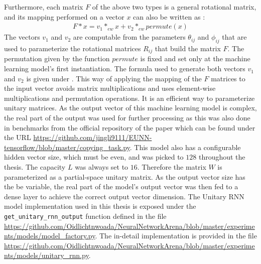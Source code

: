 \documentclass[draft,final]{vutinfth} %
\begin{document}
Furthermore, each matrix $F$ of the above two types is a general rotational matrix, and its mapping performed on a vector $x$ can also be written as \cite[p. 4]{EfficientUnitaryRNNs}:
\begin{align}
F*x = v_1 *_{ew} x + v_2 *_{ew} permute(x)
\end{align}
The vectors $v_1$ and $v_2$ are computable from the parameters $\theta_{ij}$ and $\phi_{ij}$ that are used to parameterize the rotational matrices $R_{ij}$ that build the matrix $F$.
The permutation given by the function $permute$ is fixed and set only at the machine learning model's first instantiation.
The formula used to generate both vectors $v_1$ and $v_2$ is given under \cite[p. 4]{EfficientUnitaryRNNs}.
This way of applying the mapping of the $F$ matrices to the input vector avoids matrix multiplications and uses element-wise multiplications and permutation operations. It is an efficient way to parameterize unitary matrices.
As the output vector of this machine learning model is complex, the real part of the output was used for further processing as this was also done in benchmarks from the official repository of the paper \cite{EfficientUnitaryRNNs} which can be found under the URL \url{https://github.com/jingli9111/EUNN-tensorflow/blob/master/copying_task.py}.
This model also has a configurable hidden vector size, which must be even, and was picked to $128$ throughout the thesis.
The capacity $L$ was always set to $16$. Therefore the matrix $W$ is parameterized as a partial-space unitary matrix.
As the output vector size has the be variable, the real part of the model's output vector was then fed to a dense layer to achieve the correct output vector dimension.
The Unitary RNN model implementation used in this thesis is exposed under the \texttt{get\_unitary\_rnn\_output} function defined in the file \url{https://github.com/Oidlichtnwoada/NeuralNetworkArena/blob/master/experiments/models/model_factory.py}.
The in-detail implementation is provided in the file \url{https://github.com/Oidlichtnwoada/NeuralNetworkArena/blob/master/experiments/models/unitary_rnn.py}.
\end{document}

